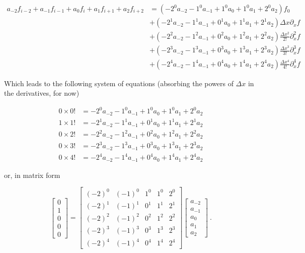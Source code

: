 \documentclass[a4paper,11pt]{article}
\begin{document}
\begin{equation}
\begin{aligned}
a_{-2}f_{i-2} + a_{-1}f_{i-1} + a_{0}f_{i} + a_{1}f_{i+1} + a_{2}f_{i+2}
&=
\left(-2^{0}a_{-2} - 1^{0}a_{-1} + 1^{0}a_{0} + 1^{0}a_{1} + 2^{0}a_{2}\right)f_{0}\\
&+
\left(-2^{1}a_{-2} - 1^{1}a_{-1} + 0^{1}a_{0} + 1^{1}a_{1} + 2^{1}a_{2}\right)\Delta x\partial_{x}f\\
&+
\left(-2^{2}a_{-2} - 1^{2}a_{-1} + 0^{2}a_{0} + 1^{2}a_{1} + 2^{2}a_{2}\right)\frac{\Delta x^{2}}{2!}\partial_{x}^{2}f\\
&+
\left(-2^{3}a_{-2} - 1^{3}a_{-1} + 0^{3}a_{0} + 1^{3}a_{1} + 2^{3}a_{2}\right)\frac{\Delta x^{3}}{3!}\partial_{x}^{3}f\\
&+
\left(-2^{4}a_{-2} - 1^{4}a_{-1} + 0^{4}a_{0} + 1^{4}a_{1} + 2^{4}a_{2}\right)\frac{\Delta x^{4}}{4!}\partial_{x}^{4}f
\end{aligned}
\end{equation}

Which leads to the following system of equations (absorbing the powers of $\Delta x$ in the derivatives, for now)

\begin{equation}
\begin{aligned}
0\times0! &= -2^{0}a_{-2} - 1^{0}a_{-1} + 1^{0}a_{0} + 1^{0}a_{1} + 2^{0}a_{2}\\
1\times1! &= -2^{1}a_{-2} - 1^{1}a_{-1} + 0^{1}a_{0} + 1^{1}a_{1} + 2^{1}a_{2}\\
0\times2! &= -2^{2}a_{-2} - 1^{2}a_{-1} + 0^{2}a_{0} + 1^{2}a_{1} + 2^{2}a_{2}\\
0\times3! &= -2^{3}a_{-2} - 1^{3}a_{-1} + 0^{3}a_{0} + 1^{3}a_{1} + 2^{3}a_{2}\\
0\times4! &= -2^{4}a_{-2} - 1^{4}a_{-1} + 0^{4}a_{0} + 1^{4}a_{1} + 2^{4}a_{2}
\end{aligned}
\end{equation}

or, in matrix form

\begin{equation}
\begin{bmatrix}
0\\
1\\
0\\
0\\
0
\end{bmatrix}
=
\begin{bmatrix}
(-2)^{0} & (-1)^{0} & 1^{0} & 1^{0} & 2^{0}\\
(-2)^{1} & (-1)^{1} & 0^{1} & 1^{1} & 2^{1}\\
(-2)^{2} & (-1)^{2} & 0^{2} & 1^{2} & 2^{2}\\
(-2)^{3} & (-1)^{3} & 0^{3} & 1^{3} & 2^{3}\\
(-2)^{4} & (-1)^{4} & 0^{4} & 1^{4} & 2^{4}
\end{bmatrix}
\begin{bmatrix}
a_{-2}\\
a_{-1}\\
a_{0}\\
a_{1}\\
a_{2}
\end{bmatrix}\ .
\end{equation}
\end{document}
